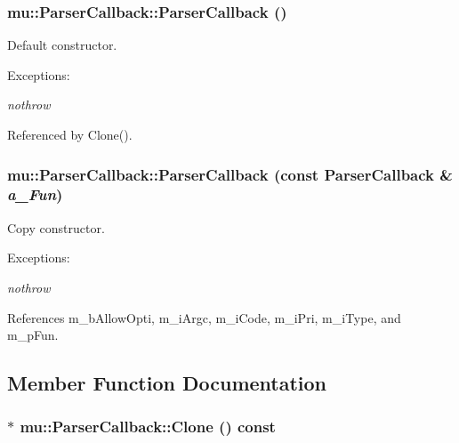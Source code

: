 \subsubsection[ParserCallback]{\setlength{\rightskip}{0pt plus 5cm}mu::ParserCallback::ParserCallback ()}\label{classmu_1_1ParserCallback_2c460fd6954bfcb8416275cf660e5160}


Default constructor. 

\begin{Desc}
\item[Exceptions:]
\begin{description}
\item[{\em nothrow}]\end{description}
\end{Desc}


Referenced by Clone().
\subsubsection[ParserCallback]{\setlength{\rightskip}{0pt plus 5cm}mu::ParserCallback::ParserCallback (const {\bf ParserCallback} \& {\em a\_\-Fun})}\label{classmu_1_1ParserCallback_689eab6da426078ed50e2794865f8cf9}


Copy constructor. 

\begin{Desc}
\item[Exceptions:]
\begin{description}
\item[{\em nothrow}]\end{description}
\end{Desc}


References m\_\-bAllowOpti, m\_\-iArgc, m\_\-iCode, m\_\-iPri, m\_\-iType, and m\_\-pFun.

\subsection{Member Function Documentation}
\subsubsection[Clone]{ $\ast$ mu::ParserCallback::Clone () const}\label{classmu_1_1ParserCallback_a78005daec4187a7843871911585629e}


